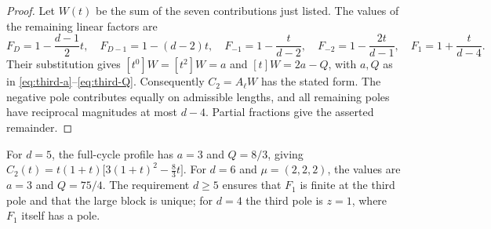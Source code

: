 \begin{proof}
Let $W(t)$ be the sum of the seven contributions just listed.
The values of the remaining linear factors are
\[
 F_D=1-\frac{d-1}{2}t,\quad F_{D-1}=1-(d-2)t,\quad
 F_{-1}=1-\frac{t}{d-2},\quad
 F_{-2}=1-\frac{2t}{d-1},\quad F_1=1+\frac{t}{d-4}.
\]
Their substitution gives
$[t^0]W=[t^2]W=a$ and $[t]W=2a-Q$,
with $a,Q$ as in \eqref{eq:third-a}--\eqref{eq:third-Q}.
Consequently $C_2=A_\ell W$ has the stated form.
The negative pole contributes equally on admissible lengths,
and all remaining poles have reciprocal magnitudes at most
$d-4$. Partial fractions give the asserted remainder.
\end{proof}

For $d=5$, the full-cycle profile has $a=3$ and $Q=8/3$, giving
$C_2(t)=t(1+t)\bigl[3(1+t)^2-\frac83t\bigr]$.
For $d=6$ and $\mu=(2,2,2)$, the values are $a=3$ and $Q=75/4$.
The requirement $d\ge5$ ensures that $F_1$ is finite at the
third pole and that the large block is unique; for $d=4$ the third pole is $z=1$, where $F_1$ itself has a pole.
